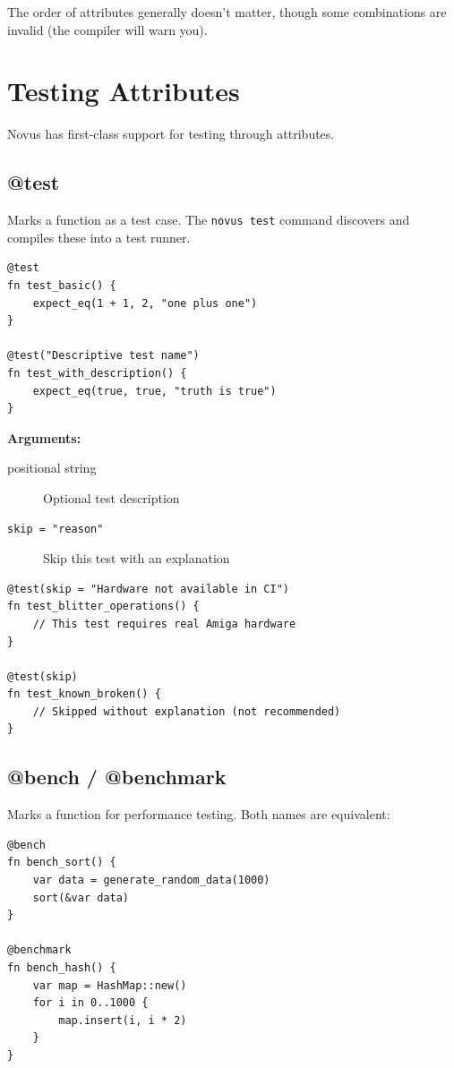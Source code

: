 The order of attributes generally doesn't matter, though some combinations are invalid (the compiler will warn you).

\section{Testing Attributes}
\label{sec:testing-attributes}

Novus has first-class support for testing through attributes.

\subsection{@test}

Marks a function as a test case. The \texttt{novus test} command discovers and compiles these into a test runner.

\begin{lstlisting}
@test
fn test_basic() {
    expect_eq(1 + 1, 2, "one plus one")
}

@test("Descriptive test name")
fn test_with_description() {
    expect_eq(true, true, "truth is true")
}
\end{lstlisting}

\textbf{Arguments:}
\begin{description}
    \item[positional string] Optional test description
    \item[\texttt{skip = "reason"}] Skip this test with an explanation
\end{description}

\begin{lstlisting}
@test(skip = "Hardware not available in CI")
fn test_blitter_operations() {
    // This test requires real Amiga hardware
}

@test(skip)
fn test_known_broken() {
    // Skipped without explanation (not recommended)
}
\end{lstlisting}

\subsection{@bench / @benchmark}

Marks a function for performance testing. Both names are equivalent:

\begin{lstlisting}
@bench
fn bench_sort() {
    var data = generate_random_data(1000)
    sort(&var data)
}

@benchmark
fn bench_hash() {
    var map = HashMap::new()
    for i in 0..1000 {
        map.insert(i, i * 2)
    }
}
\end{lstlisting}

